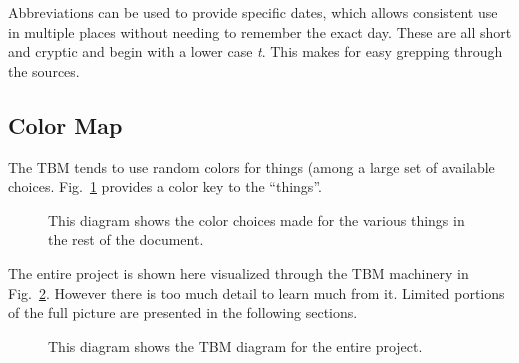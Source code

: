 Abbreviations can be used to provide specific dates, which allows
consistent use in multiple places without needing to remember the
exact day.  These are all short and cryptic and begin with a lower
case \textit{t}.  This makes for easy grepping through the sources.


\subsection{Color Map}

The \ac{TBM} tends to use random colors for things (among a large
set of available choices.  Fig.~\ref{fig:legend} provides a color
key to the ``things''.
\begin{figure}[p!]%
\captionsetup{width=0.6\linewidth}
\caption[Color Legend]{This diagram shows the color choices made
for the various things in the rest of the document.}
\label{fig:legend}
\end{figure}

The entire project is shown here visualized through the \ac{TBM}
machinery in Fig.~\ref{fig:allofit}.  However there is too much
detail to learn much from it.  Limited portions of the full picture
are presented in the following sections.
\begin{figure}[p!]%
\captionsetup{width=0.6\linewidth}
\caption[Everything]{This diagram shows the \ac{TBM} diagram
for the entire project.}
\label{fig:allofit}
\end{figure}

%
%
